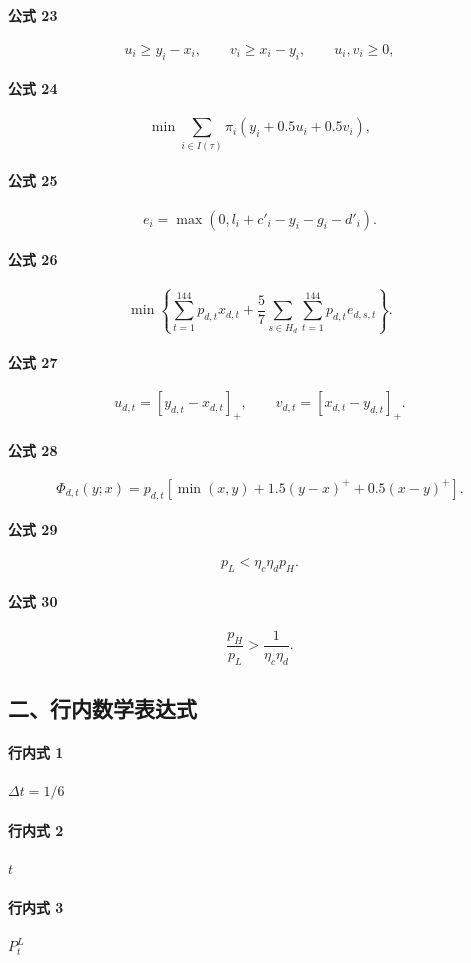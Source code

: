 \documentclass[12pt]{article}
\begin{document}
\paragraph{公式 23}
\[
u_i\ge y_i-x_i,\qquad v_i\ge x_i-y_i,\qquad u_i,v_i\ge0,
\]
\paragraph{公式 24}
\[
\min\sum_{i\in I(\tau)}\pi_i\left(y_i+0.5u_i+0.5v_i\right),
\]
\paragraph{公式 25}
\[
e_i=\max\left(0,l_i+c'_i-y_i-g_i-d'_i\right).
\]
\paragraph{公式 26}
\[
\min\left\{
\sum_{t=1}^{144}p_{d,t}x_{d,t}
+\frac57\sum_{s\in H_d}\sum_{t=1}^{144}p_{d,t}e_{d,s,t}
\right\}.
\]
\paragraph{公式 27}
\[
u_{d,t}=[y_{d,t}-x_{d,t}]_+,\qquad
v_{d,t}=[x_{d,t}-y_{d,t}]_+.
\]
\paragraph{公式 28}
\[
\Phi_{d,t}(y;x)=p_{d,t}\left[\min(x,y)+1.5(y-x)^++0.5(x-y)^+\right].
\]
\paragraph{公式 29}
\[
p_L < \eta_c\eta_d p_H.
\]
\paragraph{公式 30}
\[
\frac{p_H}{p_L}>\frac{1}{\eta_c\eta_d}.
\]
\subsection*{二、行内数学表达式}
\paragraph{行内式 1}
\(\Delta t=1/6\)
\paragraph{行内式 2}
\(t\)
\paragraph{行内式 3}
\(P^L_t\)
\end{document}
